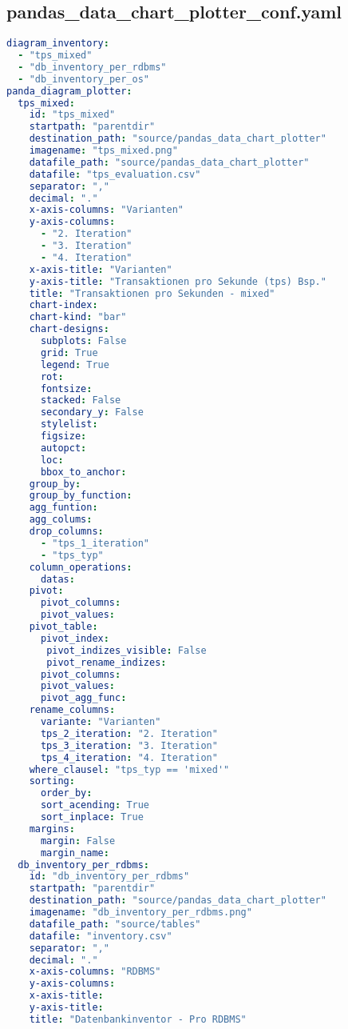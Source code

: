 
\subsection{pandas\_data\_chart\_plotter\_conf.yaml}
\lstset{style=gra_codestyle}
\begin{lstlisting}[language=yaml, caption=Python LaTex - pandas\_data\_chart\_plotter\_conf.yaml - Konfigurationsdatei - CSV - Diagramme,captionpos=b,label={lst:pandas_data_chart_plotter_conf},breaklines=true]
diagram_inventory:
  - "tps_mixed"
  - "db_inventory_per_rdbms"
  - "db_inventory_per_os"
panda_diagram_plotter:
  tps_mixed:
    id: "tps_mixed"
    startpath: "parentdir"
    destination_path: "source/pandas_data_chart_plotter"
    imagename: "tps_mixed.png"
    datafile_path: "source/pandas_data_chart_plotter"
    datafile: "tps_evaluation.csv"
    separator: ","
    decimal: "."
    x-axis-columns: "Varianten"
    y-axis-columns:
      - "2. Iteration"
      - "3. Iteration"
      - "4. Iteration"
    x-axis-title: "Varianten"
    y-axis-title: "Transaktionen pro Sekunde (tps) Bsp."
    title: "Transaktionen pro Sekunden - mixed"
    chart-index:
    chart-kind: "bar"
    chart-designs:
      subplots: False
      grid: True
      legend: True
      rot:
      fontsize:
      stacked: False
      secondary_y: False
      stylelist:
      figsize:
      autopct:
      loc:
      bbox_to_anchor:
    group_by:
    group_by_function:
    agg_funtion:
    agg_colums:
    drop_columns:
      - "tps_1_iteration"
      - "tps_typ"
    column_operations:
      datas:
    pivot:
      pivot_columns:
      pivot_values:
    pivot_table:
      pivot_index:
       pivot_indizes_visible: False
       pivot_rename_indizes:
      pivot_columns:
      pivot_values:
      pivot_agg_func:
    rename_columns:
      variante: "Varianten"
      tps_2_iteration: "2. Iteration"
      tps_3_iteration: "3. Iteration"
      tps_4_iteration: "4. Iteration"
    where_clausel: "tps_typ == 'mixed'"
    sorting:
      order_by:
      sort_acending: True
      sort_inplace: True
    margins:
      margin: False
      margin_name:
  db_inventory_per_rdbms:
    id: "db_inventory_per_rdbms"
    startpath: "parentdir"
    destination_path: "source/pandas_data_chart_plotter"
    imagename: "db_inventory_per_rdbms.png"
    datafile_path: "source/tables"
    datafile: "inventory.csv"
    separator: ","
    decimal: "."
    x-axis-columns: "RDBMS"
    y-axis-columns:
    x-axis-title:
    y-axis-title:
    title: "Datenbankinventor - Pro RDBMS"

\end{lstlisting}
